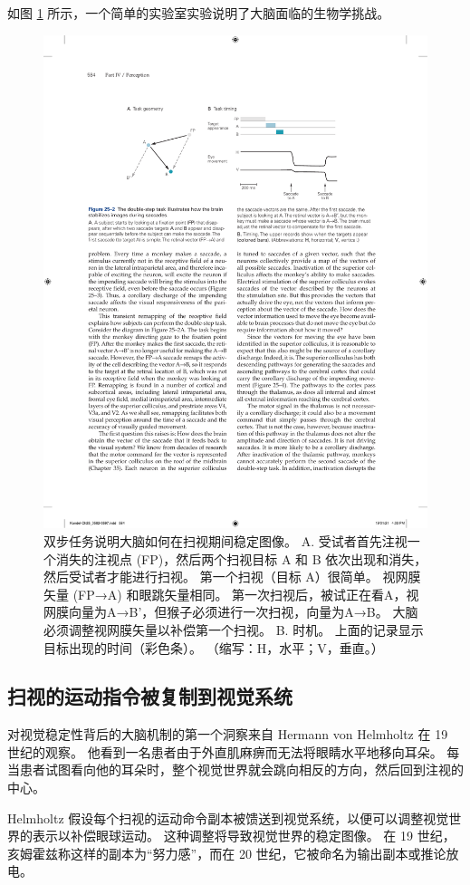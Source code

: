 如图 \ref{fig:25_2} 所示，一个简单的实验室实验说明了大脑面临的生物学挑战。

\begin{figure}[htbp]
	\centering
	\includegraphics[width=0.75\linewidth]{chap25/fig_25_2}
	\caption{双步任务说明大脑如何在扫视期间稳定图像。 A. 受试者首先注视一个消失的注视点 (FP)，然后两个扫视目标 A 和 B 依次出现和消失，然后受试者才能进行扫视。 第一个扫视（目标 A）很简单。 视网膜矢量 (FP→A) 和眼跳矢量相同。 第一次扫视后，被试正在看A，视网膜向量为A→B'，但猴子必须进行一次扫视，向量为A→B。 大脑必须调整视网膜矢量以补偿第一个扫视。 B. 时机。 上面的记录显示目标出现的时间（彩色条）。 （缩写：H，水平；V，垂直。）}
	\label{fig:25_2}
\end{figure}

\subsection{扫视的运动指令被复制到视觉系统}

对视觉稳定性背后的大脑机制的第一个洞察来自 Hermann von Helmholtz 在 19 世纪的观察。
他看到一名患者由于外直肌麻痹而无法将眼睛水平地移向耳朵。
每当患者试图看向他的耳朵时，整个视觉世界就会跳向相反的方向，然后回到注视的中心。


Helmholtz 假设每个扫视的运动命令副本被馈送到视觉系统，以便可以调整视觉世界的表示以补偿眼球运动。
这种调整将导致视觉世界的稳定图像。
在 19 世纪，亥姆霍兹称这样的副本为“努力感”，而在 20 世纪，它被命名为输出副本或推论放电。


